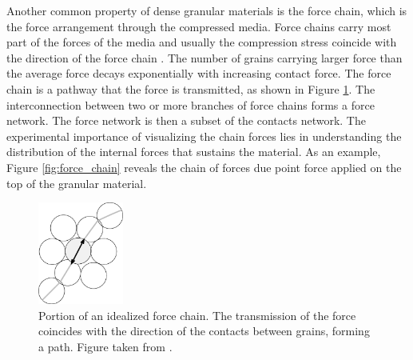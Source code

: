 
    Another common property of dense granular materials is the force chain, which is the force arrangement through the compressed media. Force chains carry most part of the forces of the media and usually the compression stress coincide with the direction of the force chain \cite{Characterization_of_force_chains_in_granular_material, Granular_and_Complex_Materials}. The number of grains carrying larger force than the average force decays exponentially with increasing contact force. The force chain is a pathway that the force is transmitted, as shown in Figure \ref{fig:pathway_chain}. The interconnection between two or more branches of force chains forms a force network. The force network is then a subset of the contacts network. The experimental importance of visualizing the chain forces lies in understanding the distribution of the internal forces that sustains the material. As an example, Figure \ref{fig:force_chain} reveals the chain of forces due point force applied on the top of the granular material.

\begin{figure}
    \centering
    \includegraphics[width=0.25\textwidth]{04-figuras/Force_Chain_Pathway.png}
    \caption[Pahtway of force chain.]{Portion of an idealized force chain. The transmission of the force coincides with the direction of the contacts between grains, forming a path. Figure taken from \cite{Characterization_of_force_chains_in_granular_material}.}
    \label{fig:pathway_chain}
\end{figure}

